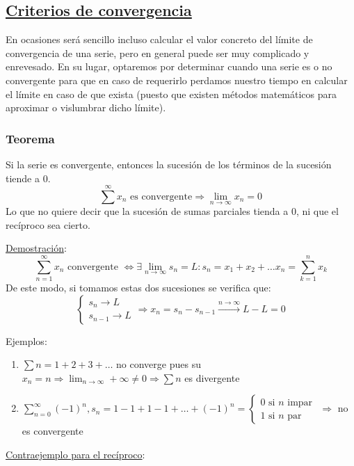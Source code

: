 \documentclass[10pt,a4paper,openright]{book}
\begin{document}
\subsection*{\underline{Criterios de convergencia}}
En ocasiones será sencillo incluso calcular el valor concreto del límite de convergencia de una serie, pero en general puede ser muy complicado y enrevesado. En su lugar, optaremos por determinar cuando una serie es o no convergente para que en caso de requerirlo perdamos nuestro tiempo en calcular el límite en caso de que exista (puesto que existen métodos matemáticos para aproximar o vislumbrar dicho límite).
\subsubsection*{Teorema}
Si la serie es convergente, entonces la sucesión de los términos de la sucesión tiende a $0$.
$$\sum^{\infty} x_n \mbox{ es convergente} \Rightarrow \lim_{n \rightarrow \infty} x_n =0$$
Lo que no quiere decir que la sucesión de sumas parciales tienda a 0, ni que el recíproco sea cierto.

\underline{Demostración}:
$$\sum_{n=1}^{\infty} x_n \mbox{ convergente } \Leftrightarrow \exists \lim_{n \to \infty} s_n = L: s_n = x_1 + x_2 + \ldots x_n = \sum_{k=1}^{n} x_k$$
De este modo, si tomamos estas dos sucesiones se verifica que:
$$\begin{cases}s_n \to L \\ s_{n-1} \to L\end{cases} \Rightarrow x_n = s_n - s_{n-1} \xrightarrow{n\rightarrow\infty} L-L = 0$$

Ejemplos: \begin{enumerate}

\item $\sum n = 1 + 2 + 3 + \ldots$ no converge pues su $x_n = n \Rightarrow \lim_{n \to \infty} +\infty \neq 0 \Rightarrow \sum n$ es divergente

\item $\sum_{n=0}^{\infty} (-1)^n , s_n = 1 - 1 + 1 - 1 + \ldots + (-1)^n = \begin{cases} 0 \mbox { si $n$ impar } \\ 1 \mbox { si $n$ par } \end{cases} \Rightarrow $ no es convergente
\end{enumerate}

\underline{Contraejemplo para el recíproco}:
\end{document}
